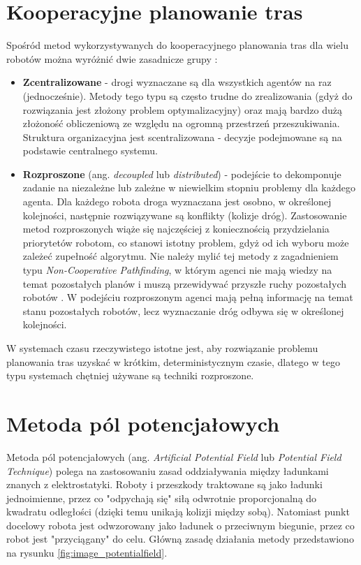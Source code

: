 \section{Kooperacyjne planowanie tras}
\label{ch:cooperative_pathfinding}

Spośród metod wykorzystywanych do kooperacyjnego planowania tras dla wielu robotów można wyróżnić dwie zasadnicze grupy \cite{latombe}:
\begin{itemize}
	\item {\bf Zcentralizowane} - drogi wyznaczane są dla wszystkich agentów na raz (jednocześnie). Metody tego typu są często trudne do zrealizowania (gdyż do rozwiązania jest złożony problem optymalizacyjny) oraz mają bardzo dużą złożoność obliczeniową ze względu na ogromną przestrzeń przeszukiwania. Struktura organizacyjna jest scentralizowana - decyzje podejmowane są na podstawie centralnego systemu.
	\item {\bf Rozproszone} (ang. {\it decoupled} lub {\it distributed}) - podejście to dekomponuje zadanie na niezależne lub zależne w niewielkim stopniu problemy dla każdego agenta. Dla każdego robota droga wyznaczana jest osobno, w określonej kolejności, następnie rozwiązywane są konflikty (kolizje dróg).
	Zastosowanie metod rozproszonych wiąże się najczęściej z koniecznością przydzielania priorytetów robotom, co stanowi istotny problem, gdyż od ich wyboru może zależeć zupełność algorytmu. Nie należy mylić tej metody z zagadnieniem typu {\it Non-Cooperative Pathfinding}, w którym agenci nie mają wiedzy na temat pozostałych planów i muszą przewidywać przyszłe ruchy pozostałych robotów \cite{cooppath}. W podejściu rozproszonym agenci mają pełną informację na temat stanu pozostałych robotów, lecz wyznaczanie dróg odbywa się w określonej kolejności.
\end{itemize}

W systemach czasu rzeczywistego istotne jest, aby rozwiązanie problemu planowania tras uzyskać w krótkim, deterministycznym czasie, dlatego w tego typu systemach chętniej używane są techniki rozproszone.

\section{Metoda pól potencjałowych}
\label{ch:theory-potential-fields}
Metoda pól potencjałowych (ang. {\it Artificial Potential Field} lub {\it Potential Field Technique}) polega na zastosowaniu zasad oddziaływania między ładunkami znanych z elektrostatyki. Roboty i przeszkody traktowane są jako ładunki jednoimienne, przez co "odpychają się" siłą odwrotnie proporcjonalną do kwadratu odległości (dzięki temu unikają kolizji między sobą). Natomiast punkt docelowy robota jest odwzorowany jako ładunek o przeciwnym biegunie, przez co robot jest "przyciągany" do celu.
Główną zasadę działania metody przedstawiono na rysunku \ref{fig:image_potentialfield}.

